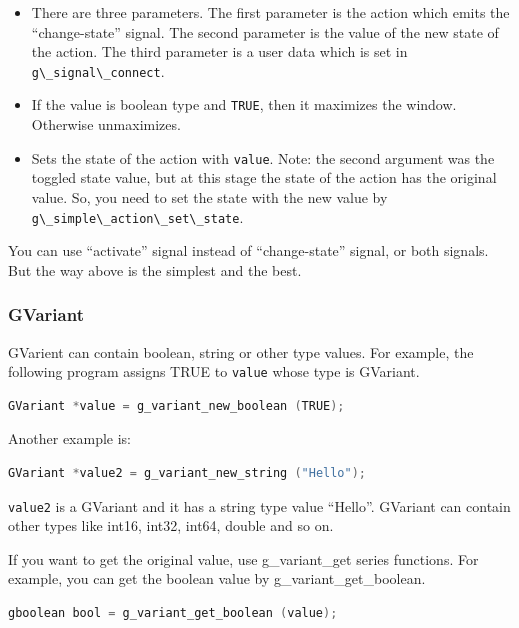 \begin{itemize}
\tightlist
\item
  There are three parameters. The first parameter is the action which
  emits the ``change-state'' signal. The second parameter is the value
  of the new state of the action. The third parameter is a user data
  which is set in \passthrough{\lstinline!g\_signal\_connect!}.
\item
  If the value is boolean type and \passthrough{\lstinline!TRUE!}, then
  it maximizes the window. Otherwise unmaximizes.
\item
  Sets the state of the action with \passthrough{\lstinline!value!}.
  Note: the second argument was the toggled state value, but at this
  stage the state of the action has the original value. So, you need to
  set the state with the new value by
  \passthrough{\lstinline!g\_simple\_action\_set\_state!}.
\end{itemize}

You can use ``activate'' signal instead of ``change-state'' signal, or
both signals. But the way above is the simplest and the best.

\hypertarget{gvariant}{%
\subsubsection{GVariant}\label{gvariant}}

GVarient can contain boolean, string or other type values. For example,
the following program assigns TRUE to \passthrough{\lstinline!value!}
whose type is GVariant.

\begin{lstlisting}[language=C]
GVariant *value = g_variant_new_boolean (TRUE);
\end{lstlisting}

Another example is:

\begin{lstlisting}[language=C]
GVariant *value2 = g_variant_new_string ("Hello");
\end{lstlisting}

\passthrough{\lstinline!value2!} is a GVariant and it has a string type
value ``Hello''. GVariant can contain other types like int16, int32,
int64, double and so on.

If you want to get the original value, use g\_variant\_get series
functions. For example, you can get the boolean value by
g\_variant\_get\_boolean.

\begin{lstlisting}[language=C]
gboolean bool = g_variant_get_boolean (value);
\end{lstlisting}

